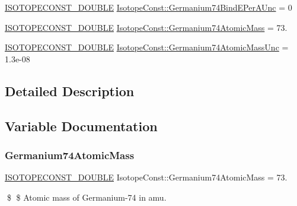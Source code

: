 \begin{DoxyCompactItemize}
\mbox{\hyperlink{group___isotope_const-_macros_ga8f45a7272ce02c0b4c65c44636ed719a}{I\+S\+O\+T\+O\+P\+E\+C\+O\+N\+S\+T\+\_\+\+D\+O\+U\+B\+LE}} \mbox{\hyperlink{group___isotope_const-_germanium-_ge74_gaa670380e4df8790424ee871ae61c501e}{Isotope\+Const\+::\+Germanium74\+Bind\+E\+Per\+A\+Unc}} = 0
\item 
\mbox{\hyperlink{group___isotope_const-_macros_ga8f45a7272ce02c0b4c65c44636ed719a}{I\+S\+O\+T\+O\+P\+E\+C\+O\+N\+S\+T\+\_\+\+D\+O\+U\+B\+LE}} \mbox{\hyperlink{group___isotope_const-_germanium-_ge74_gabda5e9dd1a48dc17c6b17eb454bb800f}{Isotope\+Const\+::\+Germanium74\+Atomic\+Mass}} = 73.
\item 
\mbox{\hyperlink{group___isotope_const-_macros_ga8f45a7272ce02c0b4c65c44636ed719a}{I\+S\+O\+T\+O\+P\+E\+C\+O\+N\+S\+T\+\_\+\+D\+O\+U\+B\+LE}} \mbox{\hyperlink{group___isotope_const-_germanium-_ge74_ga3e6e9a2b511d11cd95c176470205cfb3}{Isotope\+Const\+::\+Germanium74\+Atomic\+Mass\+Unc}} = 1.\+3e-\/08
\end{DoxyCompactItemize}


\subsection{Detailed Description}


\subsection{Variable Documentation}
\mbox{\label{group___isotope_const-_germanium-_ge74_gabda5e9dd1a48dc17c6b17eb454bb800f}} 
\subsubsection{\texorpdfstring{Germanium74\+Atomic\+Mass}{Germanium74AtomicMass}}
{\footnotesize\ttfamily \mbox{\hyperlink{group___isotope_const-_macros_ga8f45a7272ce02c0b4c65c44636ed719a}{I\+S\+O\+T\+O\+P\+E\+C\+O\+N\+S\+T\+\_\+\+D\+O\+U\+B\+LE}} Isotope\+Const\+::\+Germanium74\+Atomic\+Mass = 73.}

\$ \$ Atomic mass of Germanium-\/74 in amu. \mbox{\label{group___isotope_const-_germanium-_ge74_ga3e6e9a2b511d11cd95c176470205cfb3}} 
